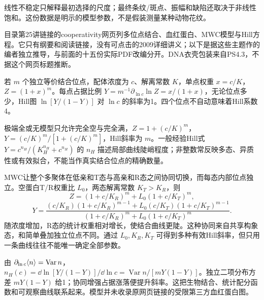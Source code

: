 \begin{center}
\end{center}
线性不稳定只解释最初选择的尺度；最终条纹/斑点、振幅和缺陷还取决于非线性饱和。这份数据是明示的模型参数，不是假装测量某种动物花纹。

目录第25讲链接的cooperativity网页列多位点结合、血红蛋白、MWC模型与Hill方程。它只有纲要和阅读链接，没有可点击的2009详细讲义；以下是据这些主题作的编者独立推导，与前面的十五份实际PDF改编分开。DNA衣壳包装来自PS4.3，不据这个网页标题推断。

若 $m$ 个独立等价结合位点，配体浓度为 $c$、解离常数 $K$，单点权重 $x=c/K$，$Z=(1+x)^m$。每点占据比例 $Y=m^{-1}\partial_{\ln c}\ln Z=x/(1+x)$，无论位点多少，Hill图 $\ln[Y/(1-Y)]$ 对 $\ln c$ 的斜率为1。四个位点不自动意味着Hill系数4。

极端全或无模型只允许完全空与完全满，$Z=1+(c/K)^m$，$Y=(c/K)^m/[1+(c/K)^m]$，Hill斜率为 $m$。一般经验Hill式 $Y=c^{n_H}/(K_H^{n_H}+c^{n_H})$ 的 $n_H$ 描述局部曲线陡峭程度；非整数常反映多态、异质性或有效拟合，不能当作真实结合位点的精确数量。

MWC让整个多聚体在低亲和T态与高亲和R态之间协同切换，而每态内部位点独立。空蛋白T/R权重比 $L_0$，两态解离常数 $K_T>K_R$，则
\[
Z=(1+c/K_R)^m+L_0(1+c/K_T)^m,
\]
\[
Y=\frac{(c/K_R)(1+c/K_R)^{m-1}+L_0(c/K_T)(1+c/K_T)^{m-1}}
{(1+c/K_R)^m+L_0(1+c/K_T)^m}.
\]
随浓度增加，R态的统计权重相对增长，使结合曲线更陡。这种协同来自共享构象态，和简单叠加独立位点不同。通过 $L_0,K_R,K_T$ 可得到多种有效Hill斜率，但只用一条曲线往往不能唯一确定全部参数。

由 $\partial_{\ln c}\langle n\rangle=\operatorname{Var}n$，$n_H(c)=\dd\ln[Y/(1-Y)]/\dd\ln c=\operatorname{Var}n/[mY(1-Y)]$。独立二项分布方差 $mY(1-Y)$ 给1；协同增强占据涨落便提升斜率。这把生物结合、统计配分函数和可观察曲线联系起来。模型并未收录原网页链接的受限第三方血红蛋白图。
